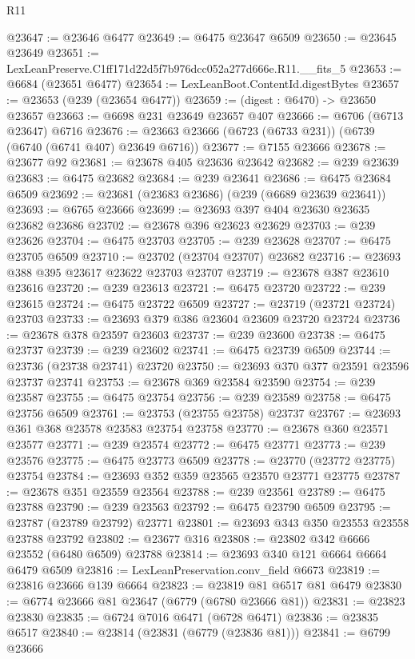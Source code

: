 \begin{lexlean}{R11}
\begin{coremodule}
@23647 := @23646 @6477
@23649 := @6475 @23647 @6509
@23650 := @23645 @23649
@23651 := LexLeanPreserve.C1ff171d22d5f7b976dcc052a277d666e.R11.__fits_5
@23653 := @6684 (@23651 @6477)
@23654 := LexLeanBoot.ContentId.digestBytes
@23657 := @23653 (@239 (@23654 @6477))
@23659 := (digest : @6470) -> @23650 @23657
@23663 := @6698 @231 @23649 @23657 @407
@23666 := @6706 (@6713 @23647) @6716
@23676 := @23663 @23666 (@6723 (@6733 @231)) (@6739 (@6740 (@6741 @407) @23649 @6716))
@23677 := @7155 @23666
@23678 := @23677 @92
@23681 := @23678 @405 @23636 @23642
@23682 := @239 @23639
@23683 := @6475 @23682
@23684 := @239 @23641
@23686 := @6475 @23684 @6509
@23692 := @23681 (@23683 @23686) (@239 (@6689 @23639 @23641))
@23693 := @6765 @23666
@23699 := @23693 @397 @404 @23630 @23635 @23682 @23686
@23702 := @23678 @396 @23623 @23629
@23703 := @239 @23626
@23704 := @6475 @23703
@23705 := @239 @23628
@23707 := @6475 @23705 @6509
@23710 := @23702 (@23704 @23707) @23682
@23716 := @23693 @388 @395 @23617 @23622 @23703 @23707
@23719 := @23678 @387 @23610 @23616
@23720 := @239 @23613
@23721 := @6475 @23720
@23722 := @239 @23615
@23724 := @6475 @23722 @6509
@23727 := @23719 (@23721 @23724) @23703
@23733 := @23693 @379 @386 @23604 @23609 @23720 @23724
@23736 := @23678 @378 @23597 @23603
@23737 := @239 @23600
@23738 := @6475 @23737
@23739 := @239 @23602
@23741 := @6475 @23739 @6509
@23744 := @23736 (@23738 @23741) @23720
@23750 := @23693 @370 @377 @23591 @23596 @23737 @23741
@23753 := @23678 @369 @23584 @23590
@23754 := @239 @23587
@23755 := @6475 @23754
@23756 := @239 @23589
@23758 := @6475 @23756 @6509
@23761 := @23753 (@23755 @23758) @23737
@23767 := @23693 @361 @368 @23578 @23583 @23754 @23758
@23770 := @23678 @360 @23571 @23577
@23771 := @239 @23574
@23772 := @6475 @23771
@23773 := @239 @23576
@23775 := @6475 @23773 @6509
@23778 := @23770 (@23772 @23775) @23754
@23784 := @23693 @352 @359 @23565 @23570 @23771 @23775
@23787 := @23678 @351 @23559 @23564
@23788 := @239 @23561
@23789 := @6475 @23788
@23790 := @239 @23563
@23792 := @6475 @23790 @6509
@23795 := @23787 (@23789 @23792) @23771
@23801 := @23693 @343 @350 @23553 @23558 @23788 @23792
@23802 := @23677 @316
@23808 := @23802 @342 @6666 @23552 (@6480 @6509) @23788
@23814 := @23693 @340 @121 @6664 @6664 @6479 @6509
@23816 := LexLeanPreservation.conv_field @6673
@23819 := @23816 @23666 @139 @6664
@23823 := @23819 @81 @6517 @81 @6479
@23830 := @6774 @23666 @81 @23647 (@6779 (@6780 @23666 @81))
@23831 := @23823 @23830
@23835 := @6724 @7016 @6471 (@6728 @6471)
@23836 := @23835 @6517
@23840 := @23814 (@23831 (@6779 (@23836 @81)))
@23841 := @6799 @23666

\end{coremodule}
\end{lexlean}

